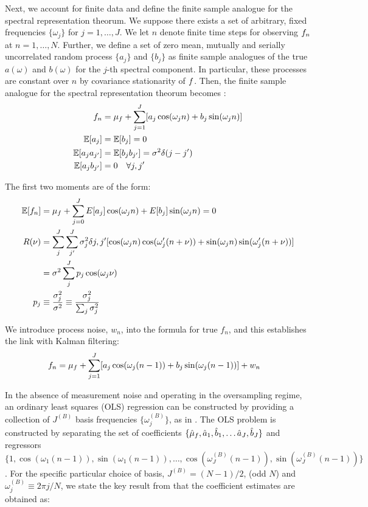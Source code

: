 Next, we account for finite data and define the finite sample analogue for the spectral representation theorum. We suppose there exists a set of arbitrary, fixed frequencies  $\{\omega_j\}$  for $j = 1, \hdots , J$. We let $n$ denote finite time steps for observing $f_n$ at $n= 1, \hdots, N$. Further, we define a set of zero mean, mutually and serially uncorrelated random process  $\{a_j \}$ and $\{b_j\}$ as finite sample analogues of the true  $a(\omega)$ and $b(\omega)$ for the $j$-th spectral component. In particular, these processes are constant over $n$ by covariance stationarity of $f$. Then, the finite sample analogue for the spectral representation theorum becomes \cite{hamilton1994time}:
\begin{align} 
f_n &= \mu_f  + \sum_{j=1}^{J}  [ a_j \cos(\omega_j n) +  b_j \sin(\omega_j n) ] \\
\mathbb{E}[a_j] & = \mathbb{E}[b_j] = 0\\
\mathbb{E}[a_ja_{j'}] &= \mathbb{E}[b_jb_{j'}] = \sigma^2 \delta(j - j') \\
\mathbb{E}[a_jb_{j'}] &= 0 \quad \forall j, j' 
\end{align}

The first two moments are of the form:
\begin{align}
\mathbb{E}[f_n] &=  \mu_f +  \sum_{j=0}^{J} E[a_j] \cos(\omega_j n) + E[b_j] \sin(\omega_j n)  = 0\\
R(\nu) &= \sum_j^{J} \sum_{j'}^{J} \sigma_j^2\delta{j,j'} [\cos(\omega_j n)\cos(\omega_j' (n+\nu)) + \sin(\omega_j n)\sin(\omega_j' (n+\nu)) ]\\
&= \sigma^2 \sum_j^{J}  p_j \cos(\omega_j\nu) \\
p_j & \equiv \frac{\sigma_j^2}{\sigma^2} \equiv \frac{\sigma_j^2}{\sum_j \sigma_j^2} 
\end{align}

We introduce process noise, $w_n$, into the formula for true $f_n$, and this establishes the link with Kalman filtering:
\begin{align} 
f_n &= \mu_f  + \sum_{j=1}^{J}  [ a_j \cos(\omega_j (n-1)) +  b_j \sin(\omega_j (n-1)) ] + w_n 
\end{align}

In the absence of measurement noise and operating in the oversampling regime, an ordinary least squares (OLS) regression can be constructed by providing a collection of $J^{(B)}$ basis frequencies $\{\omega_j^{(B)}\}$, as in \cite{hamilton1994time}. The OLS problem is constructed by separating the set of coefficients $\{\hat{\mu}_f, \hat{a}_1, \hat{b}_1, \hdots \hat{a}_J, \hat{b}_J\}$ and regressors $\{1,\cos(\omega_1 (n-1)), \sin(\omega_1 (n-1)), \hdots, \cos(\omega_J^{(B)} (n-1)), \sin(\omega_J^{(B)} (n-1)) \}$. For the specific particular choice of basis,  $J^{(B)} = (N-1)/2$, (odd $N$) and $\omega_j^{(B)} \equiv 2\pi j / N$, we state the key result from \cite{hamilton1994time} that the coefficient estimates are obtained as:

